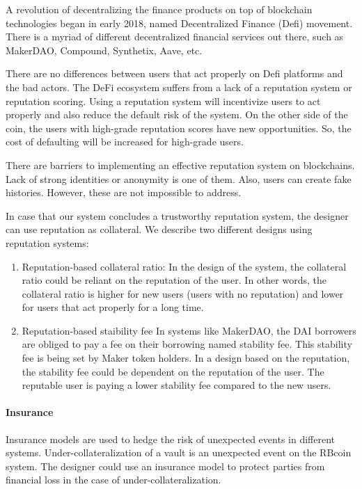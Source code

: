 A revolution of decentralizing the finance products on top of blockchain technologies began in early 2018, named Decentralized Finance (Defi) movement. There is a myriad of different decentralized financial services out there, such as MakerDAO, Compound, Synthetix, Aave, etc. 

There are no differences between users that act properly on Defi platforms and the bad actors. The DeFi ecosystem suffers from a lack of a reputation system or reputation scoring. Using a reputation system will incentivize users to act properly and also reduce the default risk of the system. On the other side of the coin, the users with high-grade reputation scores have new opportunities. So, the cost of defaulting will be increased for high-grade users.

There are barriers to implementing an effective reputation system on blockchains. Lack of strong identities or anonymity is one of them. Also, users can create fake histories. However, these are not impossible to address.

In case that our system concludes a trustworthy reputation system, the designer can use reputation as collateral.  We describe two different designs using reputation systems:
\begin{enumerate}
	\item Reputation-based collateral ratio: 
In the design of the system, the collateral ratio could be reliant on the reputation of the user. In other words, the collateral ratio is higher for new users (users with no reputation) and lower for users that act properly for a long time.
	\item Reputation-based staibility fee
In systems like MakerDAO, the DAI borrowers are obliged to pay a fee on their borrowing named stability fee. This stability fee is being set by Maker token holders.
	In a design based on the reputation, the stability fee could be dependent on the reputation of the user. The reputable user is paying a lower stability fee compared to the new users.
\end{enumerate}
 
\paragraph{Insurance}
Insurance models are used to hedge the risk of unexpected events in different systems. Under-collateralization of a vault is an unexpected event on the RBcoin system. The designer could use an insurance model to protect parties from financial loss in the case of under-collateralization. 

